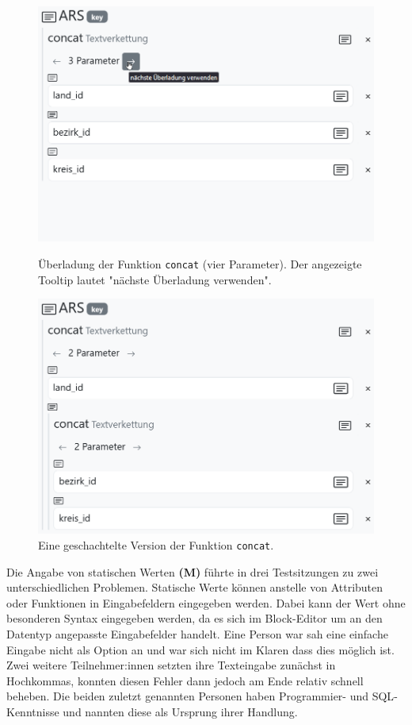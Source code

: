 \begin{figure}[!ht]
  \includegraphics[width=\linewidth]{assets/concat-overload.png}
  \caption{Überladung der Funktion \texttt{concat} (vier Parameter). Der angezeigte Tooltip lautet "nächste Überladung verwenden".}
  \label{fig:concat-overload}
  \endminipage
  \hfill
  \includegraphics[width=\linewidth]{assets/concat-nested.png}
  \caption{Eine geschachtelte Version der Funktion \texttt{concat}.}
  \label{fig:concat-nested}
  \endminipage
\end{figure}

Die Angabe von statischen Werten \textbf{(M)} führte in drei Testsitzungen zu zwei unterschiedlichen Problemen. Statische Werte können anstelle von Attributen oder Funktionen in Eingabefeldern eingegeben werden. Dabei kann der Wert ohne besonderen Syntax eingegeben werden, da es sich im Block-Editor um an den Datentyp angepasste Eingabefelder handelt. Eine Person war sah eine einfache Eingabe nicht als Option an und war sich nicht im Klaren dass dies möglich ist. Zwei weitere Teilnehmer:innen setzten ihre Texteingabe zunächst in Hochkommas, konnten diesen Fehler dann jedoch am Ende relativ schnell beheben. Die beiden zuletzt genannten Personen haben Programmier- und \ac{SQL}-Kenntnisse und nannten diese als Ursprung ihrer Handlung.

